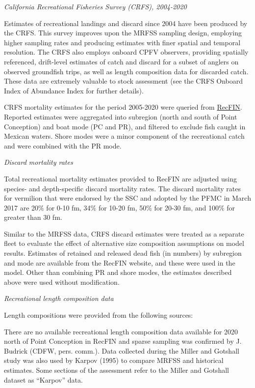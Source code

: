 \documentclass[
  english,
  a4paper,
]{article}
\begin{document}
\emph{California Recreational Fisheries Survey (CRFS), 2004-2020}

Estimates of recreational landings and discard since 2004 have been produced by
the CRFS. This survey improves upon the MRFSS sampling design, employing higher
sampling rates and producing estimates with finer spatial and temporal resolution.
The CRFS also employs onboard CPFV observers, providing spatially referenced,
drift-level estimates of catch and discard for a subset of anglers on observed
groundfish trips, as well as length composition data for discarded catch. These
data are extremely valuable to stock assessment (see the CRFS Onboard Index of
Abundance Index for
further details).

CRFS mortality estimates for the period 2005-2020 were queried from
\href{www.recfin.org}{RecFIN}. Reported estimates were aggregated into subregion
(north and south of Point Conception) and boat mode (PC and PR), and filtered
to exclude fish caught in Mexican waters. Shore modes were a minor component
of the recreational catch and were combined with the PR mode.

\emph{Discard mortality rates}

Total recreational mortality estimates provided to RecFIN are
adjusted using species- and depth-specific discard mortality rates.
The discard mortality rates for vermilion that were endorsed by the
SSC and adopted by the
PFMC in March 2017 are 20\% for 0-10 fm, 34\% for 10-20 fm, 50\% for 20-30 fm, and
100\% for greater than 30 fm.

Similar to the MRFSS data, CRFS discard estimates were treated as a separate
fleet to evaluate the effect of alternative size composition assumptions on
model results. Estimates of retained and released dead fish (in numbers) by
subregion and mode are available from the RecFIN website, and these were used
in the model. Other than combining PR and shore modes, the estimates described
above were used without modification.

\emph{Recreational length composition data}

Length compositions were provided from the following sources:

There are no available recreational length composition data available for 2020 north
of Point Conception in RecFIN and sparse sampling was confirmed by J. Budrick (CDFW, pers. comm.).
Data collected during the Miller and Gotshall study was also used by Karpov (1995) to compare MRFSS and historical estimates. Some sections of the assessment refer to the Miller and Gotshall dataset as ``Karpov'' data.
\end{document}
